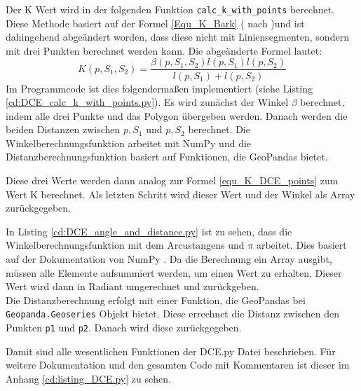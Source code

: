 {	Der K Wert wird in der folgenden Funktion \lstinline|calc_k_with_points| berechnet. Diese Methode basiert auf der Formel \ref{Equ_K_Bark} ( nach \citet{Latecki1999a})und ist dahingehend abgeändert worden, dass diese nicht mit Liniensegmenten, sondern mit drei Punkten berechnet werden kann. Die abgeänderte Formel lautet:
	\begin{equation}
		K(p,S_1,S_2) = \frac{\beta(p, S_1, S_2)l(p, S_1)l(p, S_2)}{l(p, S_1) + l(p, S_2)} 
		\label{equ_K_DCE_points}
	\end{equation}
	Im Programmcode ist dies folgendermaßen implementiert (siehe Listing \ref{cd:DCE_calc_k_with_points.py}). Es wird zunächst der Winkel $\beta$ berechnet, indem alle drei Punkte und das Polygon übergeben werden. Danach werden die beiden Distanzen zwischen $p, S_1$ und $p, S_2$ berechnet. Die Winkelberechnungsfunktion arbeitet mit NumPy und die Distanzberechnungsfunktion basiert auf Funktionen, die GeoPandas bietet.
	
	Diese drei Werte werden dann analog zur Formel \ref{equ_K_DCE_points} zum Wert K berechnet. Als letzten Schritt wird dieser Wert und der Winkel als Array zurückgegeben.
	
	In Listing \ref{cd:DCE_angle_and_distance.py} ist zu sehen, dass die Winkelberechnungsfunktion mit dem Arcustangens und $\pi$ arbeitet. Dies basiert auf der Dokumentation von NumPy \citep{numpy_angle}. Da die Berechnung ein Array ausgibt, müssen alle Elemente aufsummiert werden, um einen Wert zu erhalten. Dieser Wert wird dann in Radiant umgerechnet und zurückgeben. \\
	Die Distanzberechnung erfolgt mit einer Funktion, die GeoPandas bei \lstinline|Geopanda.Geoseries| Objekt bietet. Diese errechnet die Distanz zwischen den Punkten \lstinline|p1| und \lstinline|p2|. Danach wird diese zurückgegeben.
	
	Damit sind alle wesentlichen Funktionen der DCE.py Datei beschrieben. Für weitere Dokumentation und den gesamten Code mit Kommentaren ist dieser im Anhang \ref{cd:listing_DCE.py} zu sehen.
}



